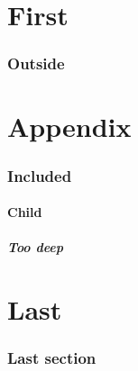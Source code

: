 \documentclass{article}
\begin{document}
\part{First}\section{Outside}
\part{Appendix}
\localtableofcontents
\section{Included}\subsection{Child}\subsubsection{Too deep}
\part{Last}\localtableofcontents\section{Last section}
\end{document}
